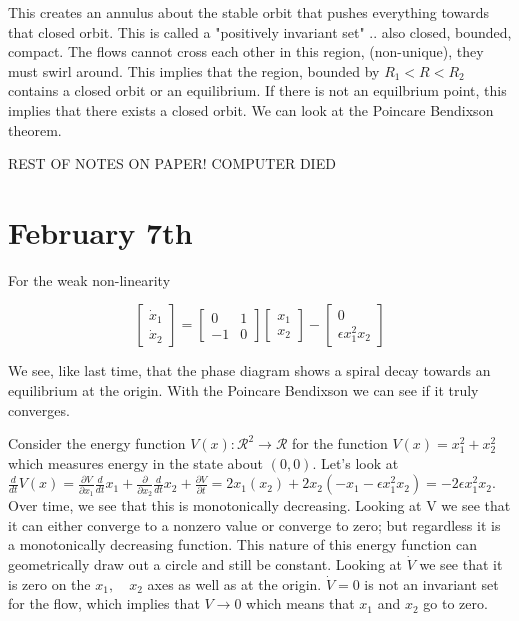 \documentclass[11pt]{article}
\begin{document}
This creates an annulus about the stable orbit that pushes everything towards that closed orbit. This is called a "positively invariant set" .. also closed, bounded, compact. The flows cannot cross each other in this region, (non-unique), they must swirl around. This implies that the region, bounded by $R_1<R<R_2$ contains a closed orbit or an equilibrium. If there is not an equilbrium point, this implies that there exists a closed orbit. We can look at the Poincare Bendixson theorem. 


REST OF NOTES ON PAPER! COMPUTER DIED 

\section*{February 7th}

For the weak non-linearity

\begin{equation}
\begin{bmatrix}
\dot{x}_1 \\
\dot{x}_2
\end{bmatrix} =
\begin{bmatrix}
0 &1 \\
-1 &0
\end{bmatrix}
\begin{bmatrix}
x_1 \\
x_2
\end{bmatrix}-\begin{bmatrix}
0\\
\epsilon x_1^2x_2
\end{bmatrix}
\end{equation}

We see, like last time, that the phase diagram shows a spiral decay towards an equilibrium at the origin. With the Poincare Bendixson we can see if it truly converges.

Consider the energy function $V(x): \mathcal{R}^2 \rightarrow \mathcal{R}$ for the function $V(x) = x_1^2 + x_2^2$ which measures energy in the state about $(0,0)$.		
Let's look at $\frac{d}{dt}V(x) = \frac{\partial V}{\partial x_1}\frac{d}{dt}x_1 + \frac{\partial}{\partial x_2}\frac{d}{dt}x_2 + \frac{\partial V}{\partial t} = 2x_1(x_2) + 2x_2(-x_1 - \epsilon x_1^2 x_2) = -2\epsilon x_1^2 x_2$. Over time, we see that this is monotonically decreasing. Looking at V we see that it can either converge to a nonzero value or converge to zero; but regardless it is a monotonically decreasing function. This nature of this energy function can geometrically draw out a circle and still be constant. Looking at $\dot{V}$ we see that it is zero on the $x_1, \quad x_2$ axes as well as at the origin. $\dot{V}=0$ is not an invariant set for the flow, which implies that $V\rightarrow0$ which means that $x_1$ and $x_2$ go to zero.
\end{document}
